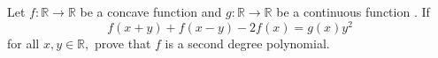 Let $f: \mathbb {R} \to \mathbb {R}$ be a concave function and  $g: \mathbb {R} \to \mathbb {R}$ be a continuous function . If $$ f (x + y) + f (x-y) -2f (x) = g (x) y^2 $$for all $x, y \in \mathbb {R}, $ prove that $f $ is a second degree polynomial.